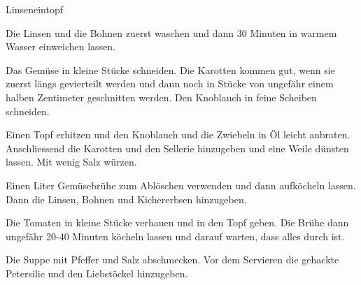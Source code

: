
\begin{recipe}[]{Linseneintopf}{}{}



\step
Die Linsen und die Bohnen zuerst waschen und dann 30 Minuten in warmem Wasser einweichen lassen.

\step
Das Gem\"use in kleine St\"ucke schneiden. Die Karotten kommen gut, wenn sie zuerst l\"angs gevierteilt werden und dann noch in St\"ucke von ungef\"ahr einem halben Zentimeter geschnitten werden. Den Knoblauch in feine Scheiben schneiden.

\step
Einen Topf erhitzen und den Knoblauch und die Zwiebeln in \"Ol leicht anbraten. Anschliessend die Karotten und den Sellerie hinzugeben und eine Weile d\"unsten lassen. Mit wenig Salz w\"urzen.

\step
Einen Liter Gem\"usebr\"uhe zum Abl\"oschen verwenden und dann aufk\"ocheln lassen. Dann die Linsen, Bohnen und Kichererbsen hinzugeben.

\step
Die Tomaten in kleine St\"ucke verhauen und in den Topf geben. Die Br\"uhe dann ungef\"ahr 20-40 Minuten k\"ocheln lassen und darauf warten, dass alles durch ist.

\step
Die Suppe mit Pfeffer und Salz abschmecken. Vor dem Servieren die gehackte Petersilie und den Liebst\"ockel hinzugeben.


\end{recipe}